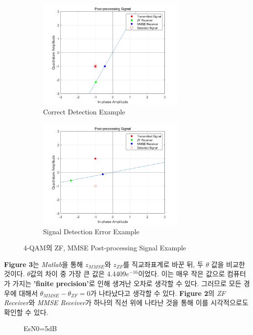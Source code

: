 \documentclass{article}
\newcommand{\bd}{\textbf} %
\begin{document}
\begin{figure}[!ht]
	\centering
	\begin{subfigure}{0.5\textwidth}
		\centerline{\includegraphics[width=0.8\textwidth]{4qam_correct.png}}
		\caption{Correct Detection Example}
	\end{subfigure}%
	\begin{subfigure}{0.5\textwidth}
		\centerline{\includegraphics[width=0.8\textwidth]{4qam_error.png}}
		\caption{Signal Detection Error Example}
	\end{subfigure}
	\caption{4-QAM의 ZF, MMSE Post-processing Signal Example}
\end{figure}

\bd{Figure 3}는 \textsl{Matlab}을 통해 $z_{MMSE}$와 $z_{ZF}$를 직교좌표계로 바꾼 뒤, 두 $\theta$ 값을 비교한 것이다. $\theta$값의 차이 중 가장 큰 값은 4.4409$e^{-16}$이었다. 이는 매우 작은 값으로 컴퓨터가 가지는 \bd{'finite precision'}로 인해 생겨난 오차로 생각할 수 있다. 그러므로 모든 경우에 대해서 $\theta_{MMSE}-\theta_{ZF}=0$가 나타났다고 생각할 수 있다. \bd{Figure 2}의 \textsl{ZF Receiver}와 \textsl{MMSE Receiver}가 하나의 직선 위에 나타난 것을 통해 이를 시각적으로도 확인할 수 있다.
\begin{figure}[!ht]
	\centering
	\caption{EsN0=5dB}
\end{figure}
\end{document}
